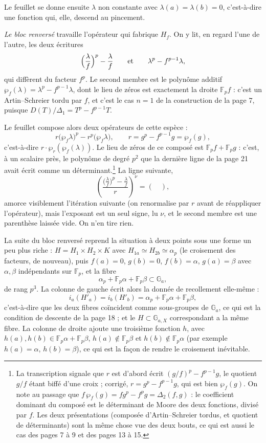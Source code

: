 \documentclass[11pt,a4paper]{article}
\begin{document}
Le feuillet se donne ensuite $\lambda$ non constante avec
$\lambda(a) = \lambda(b) = 0$, c'est-à-dire une fonction qui, elle, descend
au pincement.

\emph{Le bloc renversé} travaille l'opérateur qui fabrique $H_f$. On y lit,
en regard l'une de l'autre, les deux écritures
\[
  \Bigl(\frac{\lambda}{f}\Bigr)^{p} - \frac{\lambda}{f}
  \qquad\text{et}\qquad
  \lambda^p - f^{p-1}\lambda ,
\]
qui diffèrent du facteur $f^p$. Le second membre est le polynôme additif
$\wp_f(\lambda) = \lambda^p - f^{p-1}\lambda$, dont le lieu de zéros est
exactement la droite $\mathbb{F}_p f$ : c'est un Artin--Schreier tordu par
$f$, et c'est le cas $n = 1$ de la construction de la page 7, puisque
$D(T)/\Delta_1 = T^p - f^{p-1}T$.

Le feuillet compose alors deux opérateurs de cette espèce :
\[
  r\bigl(\wp_f \lambda\bigr)^{p} - r^{p}\bigl(\wp_f \lambda\bigr) ,
  \qquad r = g^p - f^{p-1}g = \wp_f(g) ,
\]
c'est-à-dire $r \cdot \wp_r(\wp_f(\lambda))$. Le lieu de zéros de ce composé
est $\mathbb{F}_p f + \mathbb{F}_p g$ : c'est, à un scalaire près, le
polynôme de degré $p^2$ que la dernière ligne de la page 21 avait écrit
comme un déterminant.\footnote{La transcription signale que $r$ est d'abord
écrit $(g/f)^p - f^{p-1}g$, le quotient $g/f$ étant biffé d'une croix ;
corrigé, $r = g^p - f^{p-1}g$, qui est bien $\wp_f(g)$. On note au passage
que $f\,\wp_f(g) = fg^p - f^pg = \Delta_2(f,g)$ : le coefficient dominant du
composé est le déterminant de Moore des deux fonctions, divisé par $f$. Les
deux présentations (composée d'Artin--Schreier tordus, et quotient de
déterminants) sont la même chose vue des deux bouts, ce qui est aussi le
cas des pages 7 à 9 et des pages 13 à 15.} La ligne suivante,
\[
  \left(\frac{\bigl(\frac{\lambda}{f}\bigr)^p - \frac{\lambda}{f}}
             {r}\right)^{\nu} = (\quad) ,
\]
amorce visiblement l'itération suivante (on renormalise par $r$ avant de
réappliquer l'opérateur), mais l'exposant est un seul signe, lu $\nu$, et le
second membre est une parenthèse laissée vide. On n'en tire rien.

La suite du bloc renversé reprend la situation à deux points sous une forme
un peu plus riche : $H = H_1 \times H_2 \times K$ avec
$H_{1a} \simeq H_{2b} \simeq \alpha_p$ (le croisement des facteurs, de
nouveau), puis $f(a) = 0$, $g(b) = 0$, $f(b) = \alpha$, $g(a) = \beta$ avec
$\alpha, \beta$ indépendants sur $\mathbb{F}_p$, et la fibre
\[
  \alpha_p + \mathbb{F}_p\alpha + \mathbb{F}_p\beta \subset \mathbb{G}_a ,
\]
de rang $p^3$. La colonne de gauche écrit alors la donnée de recollement
elle-même :
\[
  i_a(H'_a) = i_b(H'_b) = \alpha_p + \mathbb{F}_p\alpha +
  \mathbb{F}_p\beta ,
\]
c'est-à-dire que les deux fibres coïncident comme sous-groupes de
$\mathbb{G}_a$, ce qui est la condition de descente de la
page 18 ; et le $H \subset \mathbb{G}_{a,X}$ correspondant a la même fibre.
La colonne de droite ajoute une troisième fonction $h$, avec
$h(a), h(b) \in \mathbb{F}_p\alpha + \mathbb{F}_p\beta$,
$h(a) \notin \mathbb{F}_p\beta$ et $h(b) \notin \mathbb{F}_p\alpha$ (par
exemple $h(a) = \alpha$, $h(b) = \beta$), ce qui est la façon de rendre le
croisement inévitable.
\end{document}
